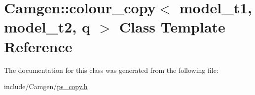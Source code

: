\hypertarget{a00066}{}\section{Camgen\+:\+:colour\+\_\+copy$<$ model\+\_\+t1, model\+\_\+t2, q $>$ Class Template Reference}
\label{a00066}


The documentation for this class was generated from the following file\+:\begin{DoxyCompactItemize}
\item 
include/\+Camgen/\hyperlink{a00740}{ps\+\_\+copy.\+h}\end{DoxyCompactItemize}
